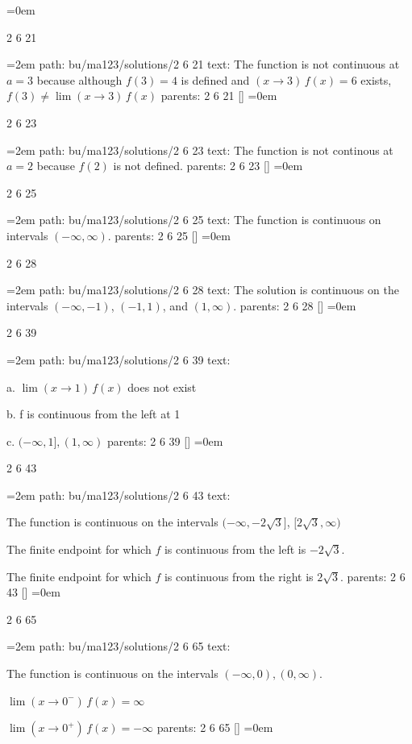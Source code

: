 \leftskip=0em
\par\endgroup
\bigskip
{}
2 6 21
\smallskip
\par\begingroup
\leftskip=2em
path: bu/ma123/solutions/2 6 21
\smallskip
text:  The function is not continuous at $a = 3$ because although $f(3) = 4$ is defined and $(x \to 3)\, f(x) = 6$ exists, $f(3) \ne \lim (x \to 3) \, f(x)$
\smallskip
parents:  2 6 21 []
\smallskip
\leftskip=0em
\par\endgroup
\bigskip
{}
2 6 23
\smallskip
\par\begingroup
\leftskip=2em
path: bu/ma123/solutions/2 6 23
\smallskip
text:  The function is not continous at $a = 2$ because $f(2)$ is not defined.
\smallskip
parents:  2 6 23 []
\smallskip
\leftskip=0em
\par\endgroup
\bigskip
{}
2 6 25
\smallskip
\par\begingroup
\leftskip=2em
path: bu/ma123/solutions/2 6 25
\smallskip
text:  The function is continuous on intervals $(-\infty, \infty)$.
\smallskip
parents:  2 6 25 []
\smallskip
\leftskip=0em
\par\endgroup
\bigskip
{}
2 6 28
\smallskip
\par\begingroup
\leftskip=2em
path: bu/ma123/solutions/2 6 28
\smallskip
text:  The solution is continuous on the intervals $(-\infty, -1)$, $(-1, 1)$, and $(1, \infty)$.
\smallskip
parents:  2 6 28 []
\smallskip
\leftskip=0em
\par\endgroup
\bigskip
{}
2 6 39
\smallskip
\par\begingroup
\leftskip=2em
path: bu/ma123/solutions/2 6 39
\smallskip
text:  \par a. $\lim (x \to 1) \, f(x)$ does not exist \par b. f is continuous from the left at 1 \par c. $(-\infty, 1], (1, \infty)$
\smallskip
parents:  2 6 39 []
\smallskip
\leftskip=0em
\par\endgroup
\bigskip
{}
2 6 43
\smallskip
\par\begingroup
\leftskip=2em
path: bu/ma123/solutions/2 6 43
\smallskip
text:  \par The function is continuous on the intervals $(-\infty, -2\sqrt{3}]$, $[2\sqrt{3}, \infty)$ \par The finite endpoint for which $f$ is continuous from the left is $-2\sqrt{3}$. \par The finite endpoint for which $f$ is continuous from the right is $2\sqrt{3}$.
\smallskip
parents:  2 6 43 []
\smallskip
\leftskip=0em
\par\endgroup
\bigskip
{}
2 6 65
\smallskip
\par\begingroup
\leftskip=2em
path: bu/ma123/solutions/2 6 65
\smallskip
text:  \par The function is continuous on the intervals $(-\infty, 0), (0, \infty)$. \par $\lim (x \to 0^{-}) \, f(x) = \infty$ \par ${\lim (x \to 0^{+}) \, f(x) = -\infty}$
\smallskip
parents:  2 6 65 []
\smallskip
\leftskip=0em
\par\endgroup
\bigskip
\bye
